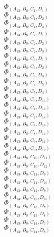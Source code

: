 \documentclass[14pt]{article}
\begin{document}
    $\Phi_{({A}_{13}, {B}_{8}, {C}_{1}, {D}_{1})}$ \\ 
    $\Phi_{({A}_{13}, {B}_{8}, {C}_{1}, {D}_{2})}$ \\ 
    $\Phi_{({A}_{13}, {B}_{8}, {C}_{1}, {D}_{3})}$ \\ 
    $\Phi_{({A}_{13}, {B}_{8}, {C}_{2}, {D}_{1})}$ \\ 
    $\Phi_{({A}_{13}, {B}_{8}, {C}_{2}, {D}_{2})}$ \\ 
    $\Phi_{({A}_{13}, {B}_{8}, {C}_{2}, {D}_{3})}$ \\ 
    $\Phi_{({A}_{13}, {B}_{8}, {C}_{3}, {D}_{1})}$ \\ 
    $\Phi_{({A}_{13}, {B}_{8}, {C}_{3}, {D}_{2})}$ \\ 
    $\Phi_{({A}_{13}, {B}_{8}, {C}_{3}, {D}_{3})}$ \\ 
    $\Phi_{({A}_{13}, {B}_{8}, {C}_{4}, {D}_{5})}$ \\ 
    $\Phi_{({A}_{13}, {B}_{8}, {C}_{5}, {D}_{4})}$ \\ 
    $\Phi_{({A}_{13}, {B}_{8}, {C}_{6}, {D}_{15})}$ \\ 
    $\Phi_{({A}_{13}, {B}_{8}, {C}_{7}, {D}_{13})}$ \\ 
    $\Phi_{({A}_{13}, {B}_{8}, {C}_{7}, {D}_{14})}$ \\ 
    $\Phi_{({A}_{13}, {B}_{8}, {C}_{8}, {D}_{13})}$ \\ 
    $\Phi_{({A}_{13}, {B}_{8}, {C}_{8}, {D}_{14})}$ \\ 
    $\Phi_{({A}_{13}, {B}_{8}, {C}_{9}, {D}_{11})}$ \\ 
    $\Phi_{({A}_{13}, {B}_{8}, {C}_{9}, {D}_{12})}$ \\ 
    $\Phi_{({A}_{13}, {B}_{8}, {C}_{10}, {D}_{11})}$ \\ 
    $\Phi_{({A}_{13}, {B}_{8}, {C}_{10}, {D}_{12})}$ \\ 
    $\Phi_{({A}_{13}, {B}_{8}, {C}_{11}, {D}_{9})}$ \\ 
    $\Phi_{({A}_{13}, {B}_{8}, {C}_{11}, {D}_{10})}$ \\ 
    $\Phi_{({A}_{13}, {B}_{8}, {C}_{12}, {D}_{9})}$ \\ 
    $\Phi_{({A}_{13}, {B}_{8}, {C}_{12}, {D}_{10})}$ \\ 
    $\Phi_{({A}_{13}, {B}_{8}, {C}_{13}, {D}_{7})}$ \\ 
    $\Phi_{({A}_{13}, {B}_{8}, {C}_{13}, {D}_{8})}$ \\ 
    $\Phi_{({A}_{13}, {B}_{8}, {C}_{14}, {D}_{7})}$ \\ 
    $\Phi_{({A}_{13}, {B}_{8}, {C}_{14}, {D}_{8})}$ \\ 
\end{document}
